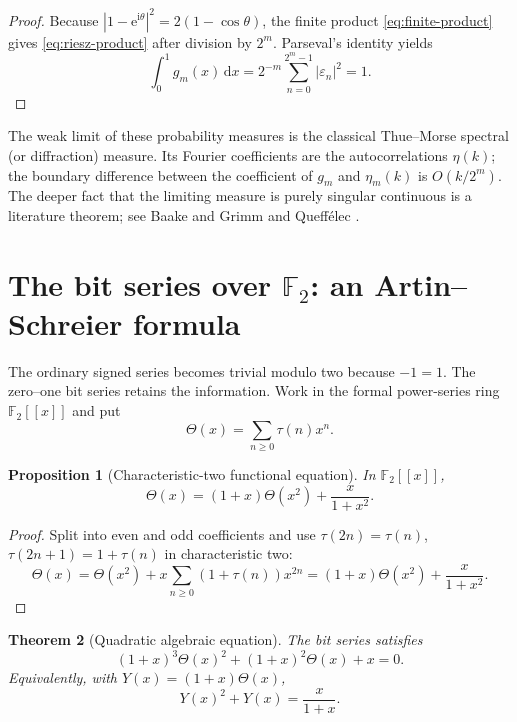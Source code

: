 \documentclass[11pt,oneside]{article}
\newtheorem{theorem}{Theorem}[section]
\newtheorem{proposition}[theorem]{Proposition}
\theoremstyle{definition}
\theoremstyle{remark}
\newcommand{\F}{\mathbb F}
\newcommand{\e}{\mathrm e}
\newcommand{\ii}{\mathrm i}
\newcommand{\dd}{\,\mathrm d}
\newcommand{\eps}{\varepsilon}
\newcommand{\1}{\mathbf 1}
\begin{document}
\begin{proof}
Because \(|1-\e^{\ii\theta}|^2=2(1-\cos\theta)\), the finite product
\eqref{eq:finite-product} gives \eqref{eq:riesz-product} after division by \(2^m\).  Parseval's
identity yields
\[
 \int_0^1g_m(x)\dd x
 =2^{-m}\sum_{n=0}^{2^m-1}|\eps_n|^2=1.
\]
\end{proof}

The weak limit of these probability measures is the classical Thue--Morse spectral (or
diffraction) measure.  Its Fourier coefficients are the autocorrelations \(\eta(k)\); the
boundary difference between the coefficient of \(g_m\) and \(\eta_m(k)\) is
\(O(k/2^m)\).  The deeper fact that the limiting measure is purely singular continuous is a
literature theorem; see Baake and Grimm \cite{baakegrimm2009} and Queff\'elec
\cite{queffelec2010}.

\section{The bit series over \texorpdfstring{\(\F_2\)}{F2}: an Artin--Schreier formula}
\label{sec:F2}

The ordinary signed series becomes trivial modulo two because \(-1=1\).  The zero--one bit
series retains the information.  Work in the formal power-series ring \(\F_2[[x]]\) and put
\begin{equation}
 \Theta(x)=\sum_{n\ge0}\tau(n)x^n.
 \label{eq:Theta}
\end{equation}

\begin{proposition}[Characteristic-two functional equation]
\label{prop:F2-functional}
In \(\F_2[[x]]\),
\begin{equation}
 \Theta(x)=(1+x)\Theta(x^2)+\frac{x}{1+x^2}.
 \label{eq:F2-functional}
\end{equation}
\end{proposition}

\begin{proof}
Split into even and odd coefficients and use
\(\tau(2n)=\tau(n)\), \(\tau(2n+1)=1+\tau(n)\) in characteristic two:
\[
 \Theta(x)=\Theta(x^2)+x\sum_{n\ge0}(1+\tau(n))x^{2n}
 =(1+x)\Theta(x^2)+\frac{x}{1+x^2}.
\]
\end{proof}

\begin{theorem}[Quadratic algebraic equation]
\label{thm:F2-quadratic}
The bit series satisfies
\begin{equation}
 \boxed{
 (1+x)^3\Theta(x)^2+(1+x)^2\Theta(x)+x=0.}
 \label{eq:F2-quadratic}
\end{equation}
Equivalently, with \(Y(x)=(1+x)\Theta(x)\),
\begin{equation}
 \boxed{
 Y(x)^2+Y(x)=\frac{x}{1+x}.}
 \label{eq:artin-schreier}
\end{equation}
\end{theorem}
\end{document}
